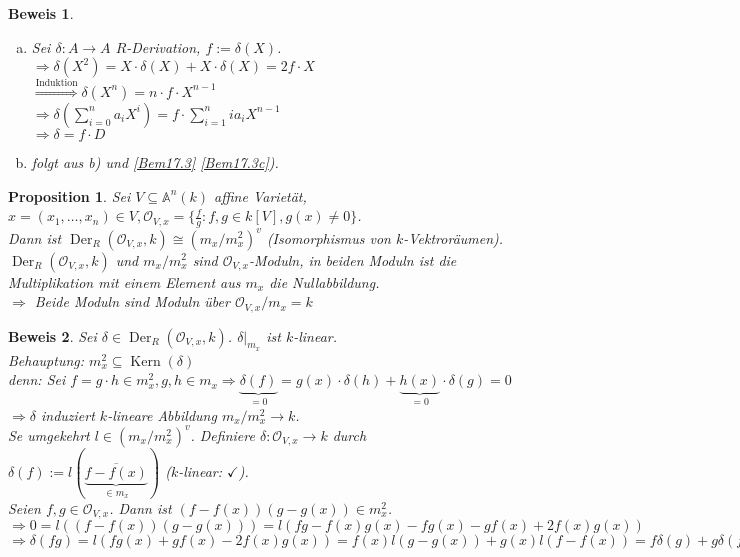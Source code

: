 \documentclass[a4paper,12pt]{report}
\theoremstyle{break}
\newtheorem{Prop}[Def]{Proposition}
\theoremstyle{nonumberbreak}
\newtheorem{Bew}{Beweis}
\theoremstyle{nonumberplain}
\newcommand{\Sum}{\sum\limits}
\DeclareMathOperator{\Kern}{Kern}
\DeclareMathOperator{\Der}{Der}
\newcommand{\A}{\mathbb{A}}
\newcommand{\calO}{\mathcal{O}}
\begin{document}
\begin{Bew}\begin{enumerate}[a)]
\item
	Sei $\delta: A\to A$ $R$-Derivation, $f:=\delta(X)$.\\
	$\Rightarrow \delta(X^2) = X\cdot\delta(X)+X\cdot\delta(X)=2f\cdot X$\\
	$\overset{\text{Induktion}}{\Longrightarrow} \delta(X^n)=n\cdot f\cdot X^{n-1}$\\
	$\Rightarrow \delta(\Sum_{i=0}^na_iX^i) = f\cdot \Sum_{i=1}^nia_iX^{n-1}$\\
	$\Rightarrow \delta=f\cdot D$
\item[c)]
	folgt aus b) und \ref{Bem17.3} \ref{Bem17.3c}).
\end{enumerate}\end{Bew}

\begin{Prop}\label{prop17.5}
Sei $V\subseteq\A^n(k)$ affine Variet\"at, $x=(x_1,\ldots ,x_n)\in V, \calO_{V,x}=\{\frac{f}{g}: f,g\in k[V], g(x)\ne 0\}$.\\
Dann ist $\Der_R(\calO_{V,x},k)\cong(m_x/m_x^2)^v$ (Isomorphismus von $k$-Vektror\"aumen).\\
$\Der_R(\calO_{V,x},k)$ und $m_x/m_x^2$ sind $\calO_{V,x}$-Moduln, in beiden Moduln ist die Multiplikation mit einem Element aus $m_x$ die Nullabbildung.\\
$\Rightarrow $ Beide Moduln sind Moduln \"uber $\calO_{V,x}/m_x=k$
\end{Prop}

\begin{Bew}
Sei $\delta \in \Der_R(\calO_{V,x},k)$. $\delta|_{m_x}$ ist $k$-linear.\\
\emph{Behauptung:} $m_x^2\subseteq\Kern(\delta)$\\
\emph{denn:} Sei $f=g\cdot h\in m_x^2, g, h\in m_x \Rightarrow \underbrace{\delta(f)}_{=0} = g(x)\cdot\delta(h)+\underbrace{h(x)}_{=0}\cdot \delta(g)=0$\\
$\Rightarrow \delta$ induziert $k$-lineare Abbildung $m_x/m_x^2 \to k$.\\
Se umgekehrt $l\in (m_x/m_x^2)^v$. Definiere $\delta: \calO_{V,x}\to k$ durch $\delta(f):=l(\overline{\underbrace{f-f(x)}_{\in m_x}})$ ($k$-linear: $\checkmark$).\\
Seien $f,g\in \calO_{V,x}$. Dann ist $(f-f(x))(g-g(x))\in m_x^2$.\\
$\Rightarrow 0=l((f-f(x))(g-g(x))) = l(fg-f(x)g(x)-fg(x)-gf(x)+2f(x)g(x))$\\
$\Rightarrow \delta(fg)= l(fg(x)+gf(x)-2f(x)g(x)) = f(x)l(g-g(x))+g(x)l(f-f(x)) = f\delta(g)+g\delta(f)$
\end{Bew}
\end{document}
